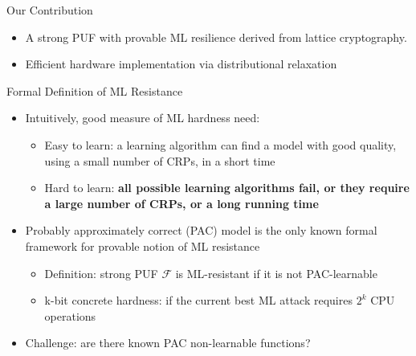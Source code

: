 \begin{frame}{Our Contribution}
\begin{itemize}
    \item A strong PUF with provable ML resilience derived from lattice cryptography.
    \item Efficient hardware implementation via distributional relaxation
\end{itemize}    
\end{frame}

\begin{frame}{Formal Definition of ML Resistance}
\begin{itemize}
    \item Intuitively, good measure of ML hardness need:
        \begin{itemize}
            \item Easy to learn: a learning algorithm can find a model with good quality, using a small number of CRPs, in a short time
            \item Hard to learn: \textbf{all possible learning algorithms fail, or they require a large number of CRPs, or a long running time}
        \end{itemize}
    \item Probably approximately correct (PAC) model is the only known formal framework for provable notion of ML resistance
    \begin{itemize}
        \item Definition: strong PUF $\mathcal{F}$ is ML-resistant if it is not PAC-learnable
        \item k-bit concrete hardness: if the current best ML attack requires $2^k$ CPU operations 
    \end{itemize}
    \item Challenge: are there known PAC non-learnable functions?
\end{itemize} 
\end{frame}

